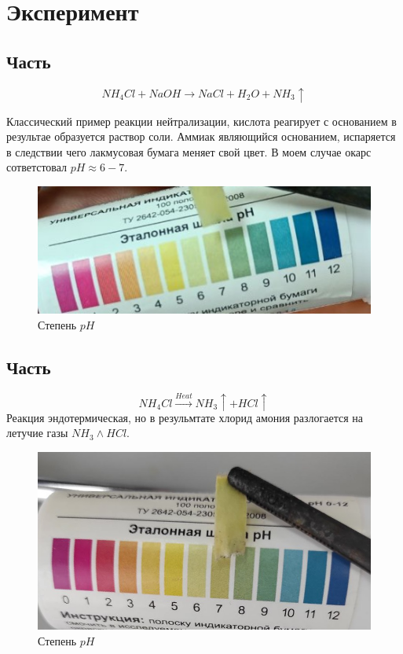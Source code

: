 \section{Эксперимент}
\subsection{Часть}
\begin{equation}
    NH_4Cl + NaOH \to NaCl + H_2O + NH_3 \uparrow
\end{equation}

Классический пример реакции нейтрализации, кислота реагирует
с основанием в результае образуется раствор соли. Аммиак 
являющийся основанием, испаряется в следствии чего лакмусовая 
бумага меняет свой цвет. В моем случае окарс сответстовал 
$pH \approx 6-7$.

\begin{figure}[h]
    \centering
    \includegraphics[width=1\linewidth]{Ex_4/1.jpg}
     \caption{Степень $pH$}
    \label{ex_4_1}
\end{figure}


\subsection{Часть}
\begin{equation}
    NH_4Cl \xrightarrow{Heat} NH_3\uparrow + HCl\uparrow
\end{equation}
Реакция эндотермическая, но в резульмтате хлорид амония 
разлогается на летучие газы $NH_3 \land HCl$.

\begin{figure}[h]
    \centering
    \includegraphics[width=1\linewidth]{Ex_4/2.jpg}
     \caption{Степень $pH$}
    \label{ex_4_2}
\end{figure}




